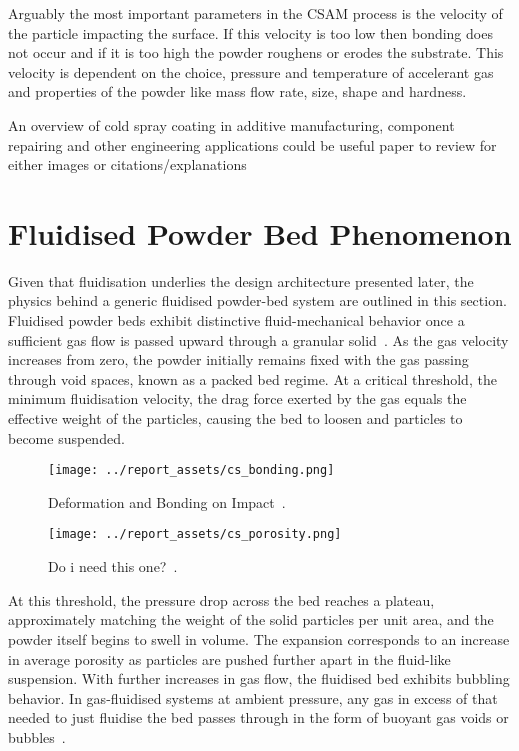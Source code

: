 Arguably the most important parameters in the CSAM process is the velocity of the particle impacting the surface. If this velocity is too low then bonding does not occur and if it is too high the powder roughens or erodes the substrate. This velocity is dependent on the choice, pressure and temperature of accelerant gas and properties of the powder like mass flow rate, size, shape and hardness. 

An overview of cold spray coating in additive
manufacturing, component repairing and other
engineering applications could be useful paper to review for either images or citations/explanations
\newpage
\section{Fluidised Powder Bed Phenomenon}
Given that fluidisation underlies the design architecture presented later, the physics behind a generic fluidised powder-bed system are outlined in this section.
Fluidised powder beds exhibit distinctive fluid-mechanical behavior once a sufficient gas flow is passed upward through a granular solid~\cite{KuniiLevenspiel1977}. As the gas velocity increases from zero, the powder initially remains fixed with the gas passing through void spaces, known as a packed bed regime. At a critical threshold, the minimum fluidisation velocity, the drag force exerted by the gas equals the effective weight of the particles, causing the bed to loosen and particles to become suspended.
\begin{figure}[htbp]
    \centering
    
    \begin{minipage}{0.45\textwidth}
        \centering
        \texttt{[image: ../report\_assets/cs\_bonding.png]}
        \caption*{Deformation and Bonding on Impact~\cite{ZHANG2024137157}.}
    \end{minipage}
    \hfill
    \begin{minipage}{0.45\textwidth}
        \centering
        \texttt{[image: ../report\_assets/cs\_porosity.png]}
        \caption*{Do i need this one?~\cite{coatings13040738}.}
    \end{minipage}
    
\end{figure}\label{fig:fluidisation}
 At this threshold, the pressure drop across the bed reaches a plateau, approximately matching the weight of the solid particles per unit area, and the powder itself begins to swell in volume. The expansion corresponds to an increase in average porosity as particles are pushed further apart in the fluid-like suspension. With further increases in gas flow, the fluidised bed exhibits bubbling behavior. In gas-fluidised systems at ambient pressure, any gas in excess of that needed to just fluidise the bed passes through in the form of buoyant gas voids or bubbles~\cite{SHENG2022137168}.

